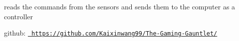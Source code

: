 reads the commands from the sensors and sends them to the computer as a controller

github\+: \href{https://github.com/Kaixinwang99/The-Gaming-Gauntlet/}{\texttt{ https\+://github.\+com/\+Kaixinwang99/\+The-\/\+Gaming-\/\+Gauntlet/}} 